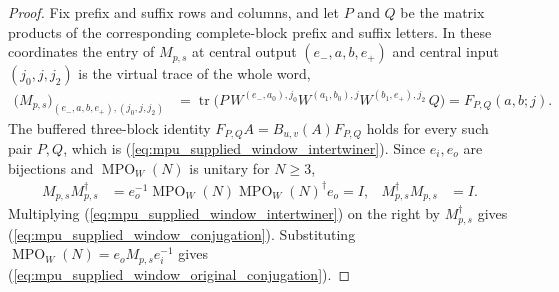 \begin{proof}\leanok
    Fix prefix and suffix rows and columns, and let $P$ and $Q$ be the
    matrix products of the corresponding complete-block prefix and suffix
    letters. In these coordinates the entry of $M_{p,s}$ at central
    output $(e_-,a,b,e_+)$ and central input $(j_0,j,j_2)$ is the virtual
    trace of the whole word,
    \begin{align}
        \bigl(M_{p,s}\bigr)_{(e_-,a,b,e_+),(j_0,j,j_2)}
         & =\operatorname{tr}\bigl(P\,W^{(e_-,a_0),j_0}
        W^{(a_1,b_0),j}W^{(b_1,e_+),j_2}\,Q\bigr)
        =F_{P,Q}(a,b;j).
        \label{eq:mpu_supplied_window_entry}
    \end{align}
    The buffered three-block identity $F_{P,Q}A=B_{u,v}(A)F_{P,Q}$ holds
    for every such pair $P,Q$, which is
    (\ref{eq:mpu_supplied_window_intertwiner}). Since $e_i,e_o$ are
    bijections and $\operatorname{MPO}_W(N)$ is unitary for $N\ge3$,
    \begin{align}
        M_{p,s}M_{p,s}^\dagger
         & =e_o^{-1}\operatorname{MPO}_W(N)\operatorname{MPO}_W(N)^\dagger e_o
        =I,
         &
        M_{p,s}^\dagger M_{p,s}
         & =I.
        \label{eq:mpu_supplied_window_unitary}
    \end{align}
    Multiplying (\ref{eq:mpu_supplied_window_intertwiner}) on the right by
    $M_{p,s}^\dagger$ gives (\ref{eq:mpu_supplied_window_conjugation}).
    Substituting $\operatorname{MPO}_W(N)=e_oM_{p,s}e_i^{-1}$ gives
    (\ref{eq:mpu_supplied_window_original_conjugation}).
\end{proof}
